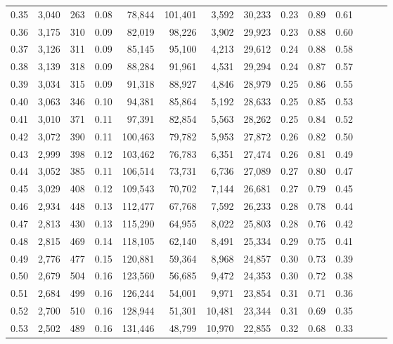 \begin{tabular}{rrrrrrrrrrrrrr}
0.35 &  3,040 &  263 &  0.08 &   78,844 &  101,401 &   3,592 &  30,233 &  0.23 &  0.89 &      0.61 \\
0.36 &  3,175 &  310 &  0.09 &   82,019 &   98,226 &   3,902 &  29,923 &  0.23 &  0.88 &      0.60 \\
0.37 &  3,126 &  311 &  0.09 &   85,145 &   95,100 &   4,213 &  29,612 &  0.24 &  0.88 &      0.58 \\
0.38 &  3,139 &  318 &  0.09 &   88,284 &   91,961 &   4,531 &  29,294 &  0.24 &  0.87 &      0.57 \\
0.39 &  3,034 &  315 &  0.09 &   91,318 &   88,927 &   4,846 &  28,979 &  0.25 &  0.86 &      0.55 \\
0.40 &  3,063 &  346 &  0.10 &   94,381 &   85,864 &   5,192 &  28,633 &  0.25 &  0.85 &      0.53 \\
0.41 &  3,010 &  371 &  0.11 &   97,391 &   82,854 &   5,563 &  28,262 &  0.25 &  0.84 &      0.52 \\
0.42 &  3,072 &  390 &  0.11 &  100,463 &   79,782 &   5,953 &  27,872 &  0.26 &  0.82 &      0.50 \\
0.43 &  2,999 &  398 &  0.12 &  103,462 &   76,783 &   6,351 &  27,474 &  0.26 &  0.81 &      0.49 \\
0.44 &  3,052 &  385 &  0.11 &  106,514 &   73,731 &   6,736 &  27,089 &  0.27 &  0.80 &      0.47 \\
0.45 &  3,029 &  408 &  0.12 &  109,543 &   70,702 &   7,144 &  26,681 &  0.27 &  0.79 &      0.45 \\
0.46 &  2,934 &  448 &  0.13 &  112,477 &   67,768 &   7,592 &  26,233 &  0.28 &  0.78 &      0.44 \\
0.47 &  2,813 &  430 &  0.13 &  115,290 &   64,955 &   8,022 &  25,803 &  0.28 &  0.76 &      0.42 \\
0.48 &  2,815 &  469 &  0.14 &  118,105 &   62,140 &   8,491 &  25,334 &  0.29 &  0.75 &      0.41 \\
0.49 &  2,776 &  477 &  0.15 &  120,881 &   59,364 &   8,968 &  24,857 &  0.30 &  0.73 &      0.39 \\
0.50 &  2,679 &  504 &  0.16 &  123,560 &   56,685 &   9,472 &  24,353 &  0.30 &  0.72 &      0.38 \\
0.51 &  2,684 &  499 &  0.16 &  126,244 &   54,001 &   9,971 &  23,854 &  0.31 &  0.71 &      0.36 \\
0.52 &  2,700 &  510 &  0.16 &  128,944 &   51,301 &  10,481 &  23,344 &  0.31 &  0.69 &      0.35 \\
0.53 &  2,502 &  489 &  0.16 &  131,446 &   48,799 &  10,970 &  22,855 &  0.32 &  0.68 &      0.33 \\

\end{tabular}
